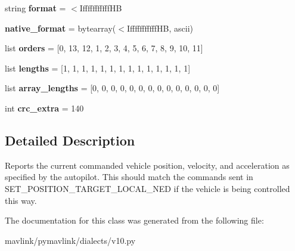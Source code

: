\begin{DoxyCompactItemize}
\item 
\mbox{\label{classpymavlink_1_1dialects_1_1v10_1_1MAVLink__position__target__local__ned__message_a5ce162c4bae51093fa882d5368f57133}} 
string {\bfseries format} = \textquotesingle{}$<$Ifffffffffff\+HB\textquotesingle{}
\item 
\mbox{\label{classpymavlink_1_1dialects_1_1v10_1_1MAVLink__position__target__local__ned__message_a4eee329f76ed39851f23a8ebca92f552}} 
{\bfseries native\+\_\+format} = bytearray(\textquotesingle{}$<$Ifffffffffff\+HB\textquotesingle{}, \textquotesingle{}ascii\textquotesingle{})
\item 
\mbox{\label{classpymavlink_1_1dialects_1_1v10_1_1MAVLink__position__target__local__ned__message_a1adfdd3f6d19654c2eeba834564efc35}} 
list {\bfseries orders} = \mbox{[}0, 13, 12, 1, 2, 3, 4, 5, 6, 7, 8, 9, 10, 11\mbox{]}
\item 
\mbox{\label{classpymavlink_1_1dialects_1_1v10_1_1MAVLink__position__target__local__ned__message_ada500167136474d5ae78015e46fa77bd}} 
list {\bfseries lengths} = \mbox{[}1, 1, 1, 1, 1, 1, 1, 1, 1, 1, 1, 1, 1, 1\mbox{]}
\item 
\mbox{\label{classpymavlink_1_1dialects_1_1v10_1_1MAVLink__position__target__local__ned__message_add40b4cf890622f4d875e4947ffa8958}} 
list {\bfseries array\+\_\+lengths} = \mbox{[}0, 0, 0, 0, 0, 0, 0, 0, 0, 0, 0, 0, 0, 0\mbox{]}
\item 
\mbox{\label{classpymavlink_1_1dialects_1_1v10_1_1MAVLink__position__target__local__ned__message_a49136cc52140965dfa73577c808b8c64}} 
int {\bfseries crc\+\_\+extra} = 140
\end{DoxyCompactItemize}


\subsection{Detailed Description}
\begin{DoxyVerb}Reports the current commanded vehicle position, velocity, and
acceleration as specified by the autopilot. This should match
the commands sent in SET_POSITION_TARGET_LOCAL_NED if the
vehicle is being controlled this way.
\end{DoxyVerb}
 

The documentation for this class was generated from the following file\+:\begin{DoxyCompactItemize}
\item 
mavlink/pymavlink/dialects/v10.\+py\end{DoxyCompactItemize}
